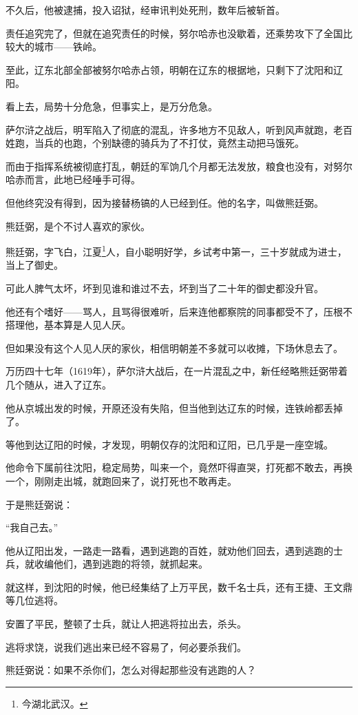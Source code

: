 \begin{multicols}{\theparacolNo}
不久后，他被逮捕，投入诏狱，经审讯判处死刑，数年后被斩首。

责任追究完了，但就在追究责任的时候，努尔哈赤也没歇着，还乘势攻下了全国比较大的城市——铁岭。

至此，辽东北部全部被努尔哈赤占领，明朝在辽东的根据地，只剩下了沈阳和辽阳。

看上去，局势十分危急，但事实上，是万分危急。

萨尔浒之战后，明军陷入了彻底的混乱，许多地方不见敌人，听到风声就跑，老百姓跑，当兵的也跑，个别缺德的骑兵为了不打仗，竟然主动把马饿死。

而由于指挥系统被彻底打乱，朝廷的军饷几个月都无法发放，粮食也没有，对努尔哈赤而言，此地已经唾手可得。

但他终究没有得到，因为接替杨镐的人已经到任。他的名字，叫做熊廷弼。

熊廷弼，是个不讨人喜欢的家伙。

熊廷弼，字飞白，江夏\footnote{今湖北武汉。}人，自小聪明好学，乡试考中第一，三十岁就成为进士，当上了御史。

可此人脾气太坏，坏到见谁和谁过不去，坏到当了二十年的御史都没升官。

他还有个嗜好——骂人，且骂得很难听，后来连他都察院的同事都受不了，压根不搭理他，基本算是人见人厌。

但如果没有这个人见人厌的家伙，相信明朝差不多就可以收摊，下场休息去了。

万历四十七年（1619年），萨尔浒大战后，在一片混乱之中，新任经略熊廷弼带着几个随从，进入了辽东。

他从京城出发的时候，开原还没有失陷，但当他到达辽东的时候，连铁岭都丢掉了。

等他到达辽阳的时候，才发现，明朝仅存的沈阳和辽阳，已几乎是一座空城。

他命令下属前往沈阳，稳定局势，叫来一个，竟然吓得直哭，打死都不敢去，再换一个，刚刚走出城，就跑回来了，说打死也不敢再走。

于是熊廷弼说：

“我自己去。”

他从辽阳出发，一路走一路看，遇到逃跑的百姓，就劝他们回去，遇到逃跑的士兵，就收编他们，遇到逃跑的将领，就抓起来。

就这样，到沈阳的时候，他已经集结了上万平民，数千名士兵，还有王捷、王文鼎等几位逃将。

安置了平民，整顿了士兵，就让人把逃将拉出去，杀头。

逃将求饶，说我们逃出来已经不容易了，何必要杀我们。

熊廷弼说：如果不杀你们，怎么对得起那些没有逃跑的人？


\end{multicols}
